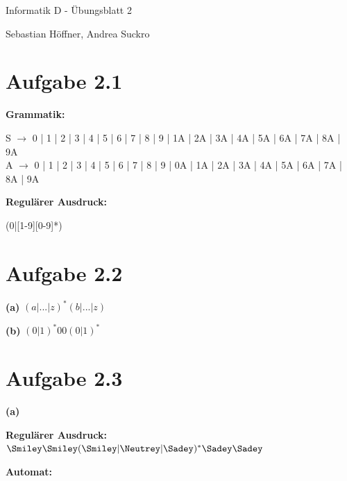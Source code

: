\documentclass{article}
\begin{document}
\begin{center}
  \Large{Informatik D - \"Ubungsblatt 2}

  \large{Sebastian H\"offner, Andrea Suckro}
\end{center}

\section{Aufgabe 2.1}

\textbf{Grammatik:}

\small
S $\rightarrow$ 0 | 1 | 2 | 3 | 4 | 5 | 6 | 7 | 8 | 9 | 1A | 2A | 3A | 4A | 5A | 6A | 7A | 8A | 9A \\
A $\rightarrow$ 0 | 1 | 2 | 3 | 4 | 5 | 6 | 7 | 8 | 9 | 0A | 1A | 2A | 3A | 4A | 5A | 6A | 7A | 8A | 9A

\normalsize
\textbf{Regul\"arer Ausdruck:}

(0|[1-9][0-9]*)

\section{Aufgabe 2.2}
\textbf{(a) } $(a|...|z)^*(b|...|z)$

\textbf{(b) } $(0|1)^*00(0|1)^*$


\section{Aufgabe 2.3}
\textbf{(a) }

\textbf{Regul\"arer Ausdruck:} $\Smiley\Smiley(\Smiley|\Neutrey|\Sadey)^*\Sadey\Sadey$

\textbf{Automat:}

\begin{center}
\end{center}
\end{document}
